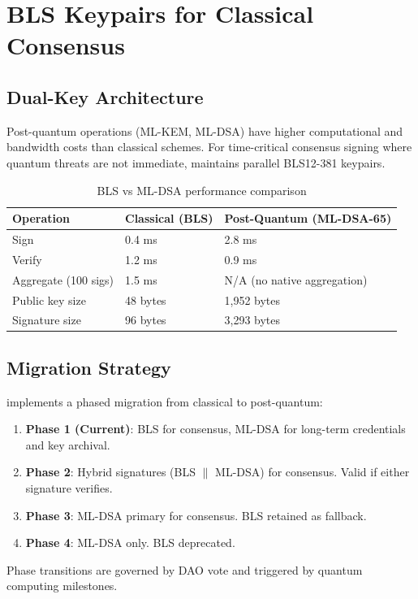 \section{BLS Keypairs for Classical Consensus}


\subsection{Dual-Key Architecture}

Post-quantum operations (ML-KEM, ML-DSA) have higher computational and bandwidth costs than classical schemes. For time-critical consensus signing where quantum threats are not immediate, \KChain{} maintains parallel BLS12-381 keypairs.

\begin{table}[h]
\centering
\begin{tabular}{lll}
\toprule
\textbf{Operation} & \textbf{Classical (BLS)} & \textbf{Post-Quantum (ML-DSA-65)} \\
\midrule
Sign & 0.4 ms & 2.8 ms \\
Verify & 1.2 ms & 0.9 ms \\
Aggregate (100 sigs) & 1.5 ms & N/A (no native aggregation) \\
Public key size & 48 bytes & 1,952 bytes \\
Signature size & 96 bytes & 3,293 bytes \\
\bottomrule
\end{tabular}
\caption{BLS vs ML-DSA performance comparison}
\label{tab:bls-vs-mldsa}
\end{table}

\subsection{Migration Strategy}

\KChain{} implements a phased migration from classical to post-quantum:

\begin{enumerate}
\item \textbf{Phase 1 (Current)}: BLS for consensus, ML-DSA for long-term credentials and key archival.
\item \textbf{Phase 2}: Hybrid signatures (BLS $\|$ ML-DSA) for consensus. Valid if either signature verifies.
\item \textbf{Phase 3}: ML-DSA primary for consensus. BLS retained as fallback.
\item \textbf{Phase 4}: ML-DSA only. BLS deprecated.
\end{enumerate}

Phase transitions are governed by DAO vote and triggered by quantum computing milestones.


